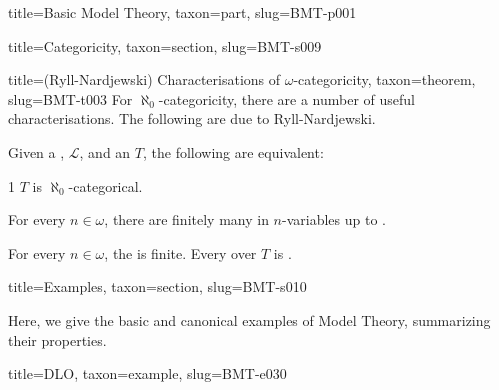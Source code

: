 \documentclass[a4paper]{article}
\begin{document}
\begin{tree}{title={Basic Model Theory}, taxon={part}, slug={BMT-p001}}
\begin{tree}{title={Categoricity}, taxon={section}, slug={BMT-s009}}
\begin{tree}{title={(Ryll-Nardjewski) Characterisations of \(\omega\)-categoricity}, taxon={theorem}, slug={BMT-t003}}
For \(\aleph _0\)-categoricity, there are a number of useful characterisations. The following are due to Ryll-Nardjewski.\par{Given a , \(\mathcal {L}\), and an  \(T\), the following are equivalent:}\par{1 \(T\) is \(\aleph _0\)-categorical.}\par{For every \(n \in   \omega\), there are finitely many  in \(n\)-variables up to .}\par{For every \(n \in   \omega\), the  is finite. 
Every  over \(T\) is . }
\end{tree}

\end{tree}


  
  
\begin{tree}{title={Examples}, taxon={section}, slug={BMT-s010}}

    Here, we give the basic and canonical examples of Model Theory, summarizing their properties.

\begin{tree}{title={DLO}, taxon={example}, slug={BMT-e030}}


\end{tree}
\end{tree}
\end{tree}
\end{document}
